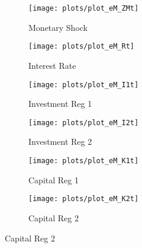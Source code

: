 \documentclass[../thesis.tex]{subfiles}
\begin{document}
	\begin{figure}[h!]
		\centering


		\begin{subfigure}[b]{0.25\textwidth}
			\centering
			\texttt{[image: plots/plot\_eM\_ZMt]}
			\caption{\footnotesize Monetary Shock}
			\label{fig:ZMt-ZMt}
		\end{subfigure}
		\hfill
		\begin{subfigure}[b]{0.25\textwidth}
			\centering
			\texttt{[image: plots/plot\_eM\_Rt]}
			\caption{\footnotesize Interest Rate}
			\label{fig:ZMt-Rt}
		\end{subfigure}
		\hfill
		\begin{subfigure}[b]{0.25\textwidth}
			\centering
			\texttt{[image: plots/plot\_eM\_I1t]}
			\caption{\footnotesize Investment Reg 1}
			\label{fig:ZMt-I1t}
		\end{subfigure}
		\hfill		
		\vspace*{0.5cm}

		
		\begin{subfigure}[b]{0.25\textwidth}
			\centering
			\texttt{[image: plots/plot\_eM\_I2t]}
			\caption{\footnotesize Investment Reg 2}
			\label{fig:ZMt-I2t}
		\end{subfigure}
		\hfill
		\begin{subfigure}[b]{0.25\textwidth}
			\centering
			\texttt{[image: plots/plot\_eM\_K1t]}
			\caption{\footnotesize Capital Reg 1}
			\label{fig:ZMt-K1t}
		\end{subfigure}
		\hfill
		\begin{subfigure}[b]{0.25\textwidth}
			\centering
			\texttt{[image: plots/plot\_eM\_K2t]}
			\caption{\footnotesize Capital Reg 2}
			\label{fig:ZMt-K2t}
		\end{subfigure}
		\hfill
		\vspace*{0.5cm}

		

\end{figure}
\end{document}
